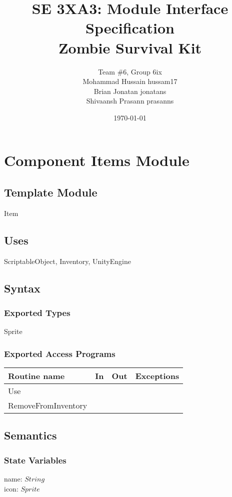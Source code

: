 \documentclass[12pt]{article}
\title{SE 3XA3: Module Interface Specification\\Zombie Survival Kit}
\author{Team \#6, Group 6ix
		\\ Mohammad Hussain hussam17
		\\ Brian Jonatan jonatans
		\\ Shivaansh Prasann prasanns
}
\date{\today}
\begin{document}
\newpage

\section* {Component Items Module}

\subsection*{Template Module}

Item

\subsection* {Uses}

ScriptableObject, Inventory, UnityEngine

\subsection* {Syntax}

\subsubsection* {Exported Types}

Sprite

\subsubsection* {Exported Access Programs}

\begin{tabular}{| l | l | l | l |}
\hline
\textbf{Routine name} & \textbf{In} & \textbf{Out} & \textbf{Exceptions}\\
\hline
Use & ~ & ~ & ~\\
\hline
RemoveFromInventory & ~ & ~ & ~\\
\hline
\end{tabular}

\subsection* {Semantics}

\subsubsection* {State Variables}

name: $String$\\
icon: $Sprite$
\end{document}
